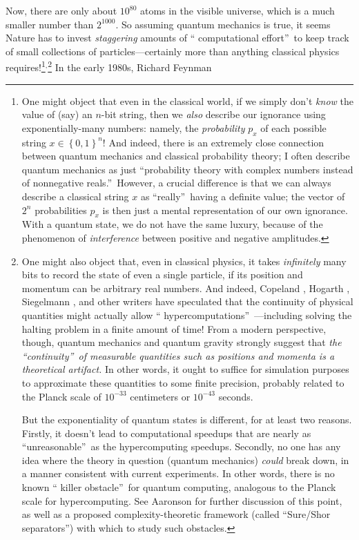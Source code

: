 \documentclass[12pt,onecolumn]{article}%
\begin{document}
Now, there are only about $10^{80}$ atoms in the visible universe, which is a
much smaller number than $2^{1000}$. So assuming quantum mechanics is true,
it seems Nature has to invest \textit{staggering} amounts of \textquotedblleft
computational effort\textquotedblright\  to keep track of small collections of
particles---certainly more than anything classical physics
requires!\footnote{One might object that even in the classical world, if we
simply don't \textit{know} the value of (say) an $n$-bit string, then we
\textit{also} describe our ignorance using exponentially-many numbers: namely,
the \textit{probability} $p_{x}$ of each possible string $x\in\left\{
0,1\right\}  ^{n}$! And indeed, there is an extremely close connection
between quantum mechanics and classical probability theory; I often describe
quantum mechanics as just \textquotedblleft probability theory with complex
numbers instead of nonnegative reals.\textquotedblright\  However, a crucial
difference is that we can always describe a classical string $x$ as
\textquotedblleft really\textquotedblright\  having a definite value; the
vector of $2^{n}$ probabilities $p_{x}$ is then just a mental representation
of our own ignorance. With a quantum state, we do not have the same luxury,
because of the phenomenon of \textit{interference} between positive and
negative amplitudes.}$^{,}$\footnote{One might also object that, even in
classical physics, it takes \textit{infinitely} many bits to record the state
of even a single particle, if its position and momentum can be arbitrary real
numbers. And indeed, Copeland \cite{copeland}, Hogarth \cite{hogarth},
Siegelmann \cite{siegelmann}, and other writers have speculated that the
continuity of physical quantities might actually allow \textquotedblleft
hypercomputations\textquotedblright\ ---including solving the halting problem in
a finite amount of time! From a modern perspective, though, quantum
mechanics and quantum gravity strongly suggest that \textit{the
\textquotedblleft continuity\textquotedblright\  of measurable quantities such
as positions and momenta is a theoretical artifact.} In other words, it
ought to suffice for simulation purposes to approximate these quantities to
some finite precision, probably related to the Planck scale of $10^{-33}%
$ centimeters or $10^{-43}$ seconds.
\par
But the exponentiality of quantum states is different, for at least two
reasons. Firstly, it doesn't lead to computational speedups that are nearly
as \textquotedblleft unreasonable\textquotedblright\  as the hypercomputing
speedups. Secondly, no one has any idea where the theory in question
(quantum mechanics) \textit{could} break down, in a manner consistent with
current experiments. In other words, there is no known \textquotedblleft
killer obstacle\textquotedblright\  for quantum computing, analogous to the
Planck scale for hypercomputing. See Aaronson \cite{aar:mlin} for further
discussion of this point, as well as a proposed complexity-theoretic framework
(called \textquotedblleft Sure/Shor separators\textquotedblright ) with which
to study such obstacles.} In the early 1980s, Richard Feynman
\end{document}
